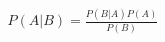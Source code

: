 \documentclass[preview]{standalone}
\begin{document}
\begin{align*}
P(A|B) = \frac{P(B|A)P(A)}{P(B)}
\end{align*}
\end{document}
